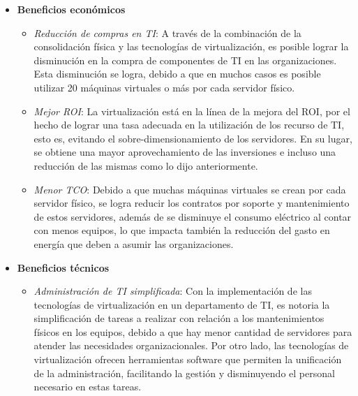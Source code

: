 \begin{itemize}
	\item \textbf{Beneficios económicos}\\
	\begin{itemize}
		
		\item \textit{Reducción de compras en TI}: A través de la combinación de la consolidación física y las tecnologías de virtualización, es posible lograr la disminución en la compra de componentes de TI en las organizaciones. Esta disminución se logra, debido a que en muchos casos es posible utilizar 20 máquinas virtuales o más por cada servidor físico. \\
		
		\item \textit{Mejor ROI}: La virtualización está en la línea de la mejora del ROI, por el hecho de lograr una tasa adecuada en la  utilización de los recurso de TI, esto es, evitando el sobre-dimensionamiento de los servidores. En su lugar, se obtiene una mayor aprovechamiento de las inversiones e incluso una reducción de las mismas como lo dijo anteriormente. \\
				
		\item \textit{Menor TCO}: Debido a que muchas máquinas virtuales se crean por cada servidor físico, se logra reducir los contratos por soporte y mantenimiento de estos servidores, además de se disminuye el consumo eléctrico al contar con menos equipos, lo que impacta también la reducción del gasto en energía que deben a asumir las organizaciones.\\
		
	\end{itemize}
	\item \textbf{Beneficios técnicos}\\
	\begin{itemize}
		\item \textit{Administración de TI simplificada}: Con la implementación de las tecnologías de virtualización en un departamento de TI, es notoria la simplificación de tareas a realizar con relación a los mantenimientos físicos en los equipos, debido a que hay menor cantidad de servidores para atender las necesidades organizacionales. Por otro lado, las tecnologías de virtualización ofrecen herramientas software que permiten la unificación de la administración, facilitando la gestión y disminuyendo el personal necesario en estas tareas.\\
		

\end{itemize}
\end{itemize}
